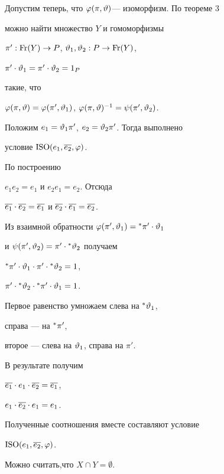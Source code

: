 Допустим теперь, что $\varphi(\pi,\vartheta)$--- изоморфизм. По теореме 3


можно найти множество $Y$ и гомоморфизмы


$\pi' : \operatorname{Fr}(Y)\to P$, $\vartheta_1,\vartheta_2 : P\to \operatorname{Fr}(Y)$,


$\pi'\cdot\vartheta_1=\pi'\cdot\vartheta_2= 1_P$


такие, что


$\varphi(\pi,\vartheta)=\varphi(\pi',\vartheta_1)$, $\varphi(\pi,\vartheta)^{-1}=\psi(\pi',\vartheta_2)$.





\begin{lem}


Положим $e_1=\vartheta_1\pi'$, $e_2=\vartheta_2\pi'$. Тогда выполнено


условие ${\mathrm{ISO}}(e_1,\overline{e_2},\varphi)$.


\end{lem}





\begin{pf} По построению


$e_1 e_2=e_1$ и $ e_2 e_1=e_2$. Отсюда


$\overline{e_1}\cdot \overline{e_2}=\overline{e_1}$ и $\overline{e_2}\cdot\overline{e_1}=\overline{e_2}$.


Из взаимной обратности $\varphi(\pi',\vartheta_1)={}^{\ast}{\pi'}\cdot\vartheta_1$


и $\psi(\pi',\vartheta_2)=\pi'\cdot{}^{\ast}{\vartheta_2}$ получаем


${}^{\ast}{\pi'}\cdot\vartheta_1\cdot\pi'\cdot{}^{\ast}{\vartheta_2}=1$,


$\pi'\cdot{}^{\ast}{\vartheta_2}\cdot{}^{\ast}{\pi'}\cdot\vartheta_1=1$.


Первое равенство умножаем слева на ${}^{\ast}{\vartheta_1}$,


справа --- на ${}^{\ast}{\pi'}$,


второе --- слева на $\vartheta_1$, справа на $\pi'$.


В результате получим


$\overline{e_1}\cdot e_1\cdot\overline{e_2}=\overline{e_1}$,


$ e_1\cdot\overline{e_2}\cdot e_1=e_1$.


Полученные соотношения вместе составляют условие


${\mathrm{ISO}}(e_1,\overline{e_2},\varphi)$.


\end{pf}





Можно считать,что $ X\cap Y=\emptyset $.


